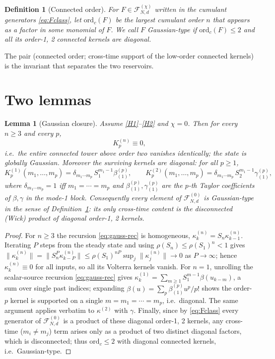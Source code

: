 \documentclass[11pt]{article}
\newtheorem{lemma}{Lemma}
\newtheorem{definition}{Definition}
\theoremstyle{remark}
\newcommand{\Fclass}[2]{\mathcal{F}^{(#1)}_{#2}}
\newcommand{\ordc}{\mathrm{ord}_c}
\begin{document}
\begin{definition}[Connected order]\label{def:ordc}
For $F\in\Fclass{\chi}{N,d}$ written in the cumulant generators \eqref{eq:Fclass},
let $\ordc(F)$ be the largest cumulant order $n$ that appears as a factor in some
monomial of $F$. We call $F$ \emph{Gaussian-type} if $\ordc(F)\le 2$ and all its
order-1, 2 connected kernels are diagonal.
\end{definition}

The pair (connected order; cross-time support of the low-order connected kernels)
is the invariant that separates the two reservoirs.

\section{Two lemmas}
\label{sec:lemmas}

\begin{lemma}[Gaussian closure]\label{lem:gauss}
Assume \ref{H1}--\ref{H2} and $\chi=0$. Then for every $n\ge3$ and every $p$,
\[
K^{(n)}_p\equiv0,
\]
i.e.\ the entire connected tower above order two vanishes identically; the state
is globally Gaussian. Moreover the surviving kernels are diagonal: for all
$p\ge1$,
\[
K^{(1)}_p(m_1,\dots,m_p)=\delta_{m_1\cdots m_p}\,S_1^{m_1-1}\beta^{(p)}_{(1)},
\qquad
K^{(2)}_p(m_1,\dots,m_p)=\delta_{m_1\cdots m_p}\,S_2^{m_1-1}\gamma^{(p)}_{(1)},
\]
where $\delta_{m_1\cdots m_p}=1$ iff $m_1=\cdots=m_p$ and
$\beta^{(p)}_{(1)},\gamma^{(p)}_{(1)}$ are the $p$-th Taylor coefficients of
$\beta,\gamma$ in the mode-1 block. Consequently every element of
$\Fclass{0}{N,d}$ is Gaussian-type in the sense of
Definition~\ref{def:ordc}: its only cross-time content is the disconnected (Wick)
product of diagonal order-1, 2 kernels.
\end{lemma}

\begin{proof}
For $n\ge3$ the recursion \eqref{eq:gauss-rec} is homogeneous,
$\kappa^{(n)}_k=S_n\kappa^{(n)}_{k-1}$. Iterating $P$ steps from the steady state
and using $\rho(S_n)\le\rho(S_1)^n<1$ gives
$\|\kappa^{(n)}_k\|=\|S_n^P\kappa^{(n)}_{k-P}\|
\le\rho(S_1)^{nP}\sup_j\|\kappa^{(n)}_j\|\to0$ as $P\to\infty$; hence
$\kappa^{(n)}_k\equiv0$ for all inputs, so all its Volterra kernels vanish. For
$n=1$, unrolling the scalar-source recursion \eqref{eq:gauss-rec} gives
$\kappa^{(1)}_k=\sum_{m\ge1}S_1^{m-1}\beta(u_{k-m})$, a sum over single past
indices; expanding $\beta(u)=\sum_p \beta^{(p)}_{(1)}u^p/p!$ shows the order-$p$
kernel is supported on a single $m=m_1=\cdots=m_p$, i.e.\ diagonal. The same
argument applies verbatim to $\kappa^{(2)}$ with $\gamma$. Finally, since by
\eqref{eq:Fclass} every generator of $\Fclass{0}{N,d}$ is a product of these
diagonal order-1, 2 kernels, any cross-time ($m_i\neq m_j$) term arises only as a
product of two distinct diagonal factors, which is disconnected; thus
$\ordc\le2$ with diagonal connected kernels, i.e.\ Gaussian-type.
\end{proof}
\end{document}
